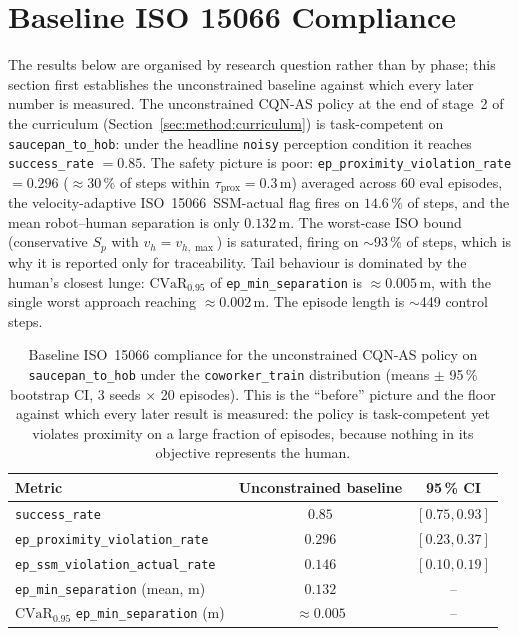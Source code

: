 \documentclass[11pt,a4paper]{report}
\newcommand{\ssm}{SSM}
\newcommand{\iso}{ISO~15066}
\newcommand{\cvar}{\ensuremath{\mathrm{CVaR}}}
\newcommand{\cqnas}{CQN-AS}
\begin{document}

\section{Baseline ISO 15066 Compliance}
\label{sec:results:baseline}

The results below are organised by research question rather than by
phase; this section first establishes the unconstrained baseline
against which every later number is measured. The unconstrained
\cqnas{} policy at the end of stage~2 of the
curriculum (Section~\ref{sec:method:curriculum}) is task-competent
on \texttt{saucepan\_to\_hob}: under the headline \texttt{noisy}
perception condition it reaches \texttt{success\_rate} $= 0.85$.
The safety picture is poor: \texttt{ep\_proximity\_violation\_rate}
$= 0.296$ ($\approx$30\,\% of steps within $\tau_{\mathrm{prox}} =
0.3$\,m) averaged across 60 eval episodes, the velocity-adaptive
\iso{}~\ssm{}-actual flag fires on $14.6\,\%$ of steps, and the mean
robot--human separation is only $0.132$\,m. The worst-case ISO bound
(conservative $S_p$ with $v_h = v_{h,\max}$) is saturated, firing on
$\sim$93\,\% of steps, which is why it is reported only for
traceability. Tail behaviour is dominated by the human's closest
lunge: $\cvar_{0.95}$ of \texttt{ep\_min\_separation} is
$\approx 0.005$\,m, with the single worst approach reaching
$\approx 0.002$\,m. The episode length is $\sim$449 control steps.

\begin{table}[h]
\centering
\caption{Baseline \iso{} compliance for the unconstrained
\cqnas{} policy on \texttt{saucepan\_to\_hob} under the
\texttt{coworker\_train} distribution (means $\pm$ 95\,\% bootstrap
CI, 3 seeds $\times$ 20 episodes). This is the ``before'' picture and
the floor against which every later result is measured: the policy is
task-competent yet violates proximity on a large fraction of
episodes, because nothing in its objective represents the human.}
\label{tab:results:baseline}
\small
\begin{tabular}{lcc}
\toprule
Metric & Unconstrained baseline & 95\,\% CI \\
\midrule
\texttt{success\_rate}                          & $0.85$  & $[0.75, 0.93]$ \\
\texttt{ep\_proximity\_violation\_rate}         & $0.296$ & $[0.23, 0.37]$ \\
\texttt{ep\_ssm\_violation\_actual\_rate}       & $0.146$ & $[0.10, 0.19]$ \\
\texttt{ep\_min\_separation} (mean, m)          & $0.132$ & -- \\
$\cvar_{0.95}$ \texttt{ep\_min\_separation} (m) & $\approx 0.005$ & -- \\
\bottomrule
\end{tabular}
\end{table}
\end{document}

